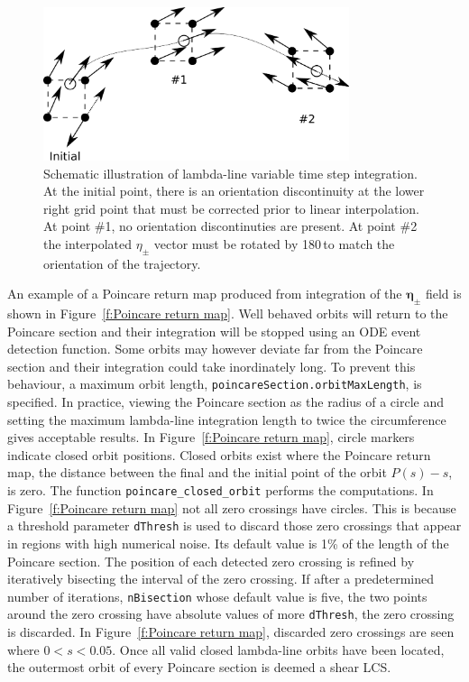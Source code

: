 \documentclass{article}
\begin{document}
\begin{figure}
\begin{center}
\includegraphics[width=0.8\textwidth]{graphics/variable_step_integration}
\end{center}
\caption{Schematic illustration of lambda-line variable time step integration. At the initial point, there is an orientation discontinuity at the lower right grid point that must be corrected prior to linear interpolation. At point \#1, no orientation discontinuties are present. At point \#2 the interpolated $\eta_\pm$ vector must be rotated by 180\degree\,to match the orientation of the trajectory.}
\label{f:variable step integration}
\end{figure}

An example of a Poincare return map produced from integration of the $\boldsymbol \eta_\pm$ field is shown in Figure~\ref{f:Poincare return map}. Well behaved orbits will return to the Poincare section and their integration will be stopped using an ODE event detection function. Some orbits may however deviate far from the Poincare section and their integration could take inordinately long. To prevent this behaviour, a maximum orbit length, \lstinline!poincareSection.orbitMaxLength!, is specified. In practice, viewing the Poincare section as the radius of a circle and setting the maximum lambda-line integration length to twice the circumference gives acceptable results. In Figure~\ref{f:Poincare return map}, circle markers indicate closed orbit positions. Closed orbits exist where the Poincare return map, the distance between the final and the initial point of the orbit $P(s)-s$, is zero. The function \lstinline!poincare_closed_orbit! performs the computations. In Figure~\ref{f:Poincare return map} not all zero crossings have circles. 
This is because a threshold parameter \lstinline!dThresh! is used to discard those zero crossings that appear in regions with high numerical noise. 
Its default value is 1\% of the length of the Poincare section.
The position of each detected zero crossing is refined by iteratively bisecting the interval of the zero crossing. If after a predetermined number of iterations, \lstinline!nBisection! whose default value is five, the two points around the zero crossing have absolute values of more \lstinline!dThresh!, the zero crossing is discarded. In Figure~\ref{f:Poincare return map}, discarded zero crossings are seen where $0 < s < 0.05$. Once all valid closed lambda-line orbits have been located, the outermost orbit of every Poincare section is deemed a shear LCS.
\end{document}
